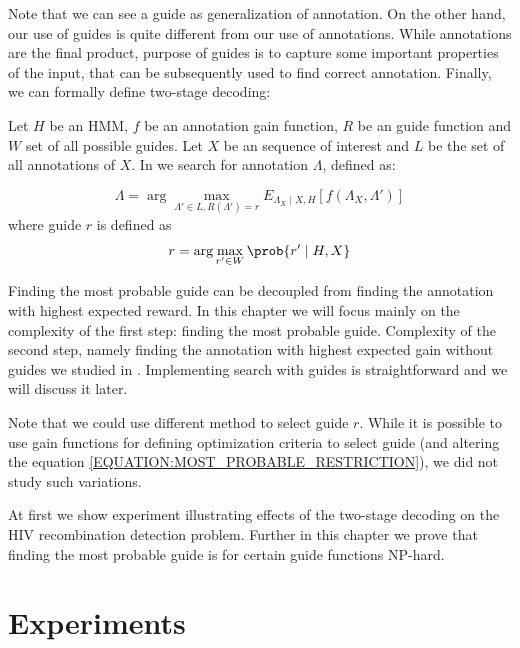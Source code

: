 Note that we can see a guide as generalization of annotation. On the other hand,
our use of guides is quite different from our use of annotations. While
annotations are the final product, purpose of guides is to capture some
important properties of the input, that can be subsequently used to find correct
annotation. Finally, we can formally define two-stage decoding:

\begin{definition}
Let $H$ be an HMM, $f$ be an annotation gain function, $R$ be an guide 
function and $W$ set of all possible guides. Let $X$ be an sequence of
interest and $L$ be the set of all annotations of $X$. In  we search for annotation $\Lambda$, defined as:

\begin{equation}
\Lambda = \arg\max_{\Lambda'\in L, R(\Lambda') = r}E_{\Lambda_X\mid
X,H}[f(\Lambda_X,\Lambda')]\label{EQUATION:HIGHEST_EXPECTED_RESTRICTED_REWARD}
\end{equation}
where guide $r$ is defined as
\begin{equation}
r = \arg\max_{r'\in W}\prob{r'\mid H, X}
\label{EQUATION:MOST_PROBABLE_RESTRICTION}
\end{equation}
\end{definition}

Finding the most probable guide can be decoupled from finding the
annotation with highest expected reward. In this chapter we will focus
mainly on the complexity of the first step: finding the most
probable guide. Complexity of the second step, namely finding the annotation
with highest expected gain without guides we studied in \cite{Nanasi2010mgr,
Nanasi2010}. Implementing search with guides is straightforward and we will
discuss it later.

Note that we could use different method to select guide $r$. While it is
possible to use gain functions for defining optimization criteria to select
guide (and altering the equation \ref{EQUATION:MOST_PROBABLE_RESTRICTION}), 
we did not study such variations.

At first we show experiment illustrating effects of the two-stage decoding on
the HIV recombination detection problem.  Further in this chapter we prove that
finding the most probable guide is for certain guide functions NP-hard.

\section{Experiments}


